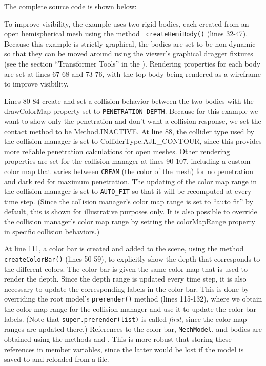 The complete source code is shown below:
%
\lstset{numbers=left}

\lstset{numbers=none} 

To improve visibility, the example uses two rigid bodies, each created
from an open hemispherical mesh using the method {\tt
createHemiBody()} (lines 32-47). Because this example is strictly
graphical, the bodies are set to be non-dynamic so that they can be
moved around using the viewer's graphical dragger fixtures (see the
section ``Transformer Tools'' in the
). 
Rendering properties for each body are set at lines
67-68 and 73-76, with the top body being rendered as a wireframe to
improve visibility.

Lines 80-84 create and set a collision behavior between the two bodies
with the {\sf drawColorMap} property set to
{\tt PENETRATION\_DEPTH}. Because for this example we
want to show only the penetration and don't want a collision response,
we set the contact method to be %
{Method.INACTIVE}.
At line 88, the collider type used by the collision manager is set to
%
{ColliderType.AJL\_CONTOUR}, since this provides more reliable
penetration calculations for open meshes.  Other rendering properties
are set for the collision manager at lines 90-107, including a custom
color map that varies between {\tt CREAM} (the color of the mesh) for
no penetration and dark red for maximum penetration. The updating of
the color map range in the collision manager is set to {\tt AUTO\_FIT}
so that it will be recomputed at every time step. (Since the collision
manager's color map range is set to ``auto fit'' by default, this is
shown for illustrative purposes only. It is also possible to override
the collision manager's color map range by setting the {\sf
colorMapRange} property in specific collision behaviors.)

At line 111, a color bar is created and added to the scene, using the
method {\tt createColorBar()} (lines 50-59), to explicitly show the
depth that corresponds to the different colors. The color bar is given
the same color map that is used to render the depth. Since the depth
range is updated every time step, it is also necessary to update the
corresponding labels in the color bar. This is done by overriding the
root model's {\tt prerender()} method (lines 115-132), where we obtain
the color map range for the collision manager and use it to update the
color bar labels. (Note that {\tt super.prerender(list)} is called {\it
first}, since the color map ranges are updated there.)
References to the color bar, {\tt MechModel}, and
bodies are obtained using the
 methods
 and
.
This is more robust that storing these references in  member
variables, since the latter would be lost if the model is saved to and
reloaded from a file.


